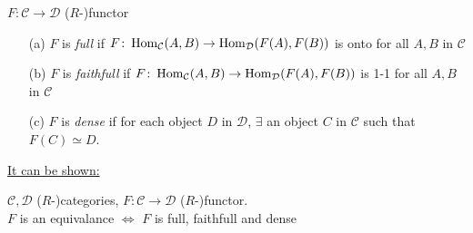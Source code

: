 \begin{defin}
$F\colon  \mathcal{C} \to \mathcal{D}$ ($R$-)functor
\begin{enumerate}
\item[(a)] $F$ is \emph{full} if $F\colon  \operatorname{Hom}_\mathcal{C}(A,B) \to \operatorname{Hom}_\mathcal{D}(F(A), F(B))$ is onto for all $A, B$ in $\mathcal{C}$
\item[(b)] $F$ is \emph{faithfull} if $F\colon  \operatorname{Hom}_\mathcal{C}(A,B) \to \operatorname{Hom}_\mathcal{D}(F(A), F(B))$ is 1-1 for all $A, B$ in $\mathcal{C}$
\item[(c)] $F$ is \emph{dense} if for each object $D$ in $\mathcal{D}$, $\exists$ an object $C$ in $\mathcal{C}$ such that $F(C) \simeq D$.
\end{enumerate}
\end{defin}

\underline{It can be shown:}
\begin{prop}
$\mathcal{C}, \mathcal{D}$ ($R$-)categories, $F\colon  \mathcal{C} \to \mathcal{D}$ ($R$-)functor.\\
$F$ is an equivalance $\iff$ $F$ is full, faithfull and dense
\end{prop}


